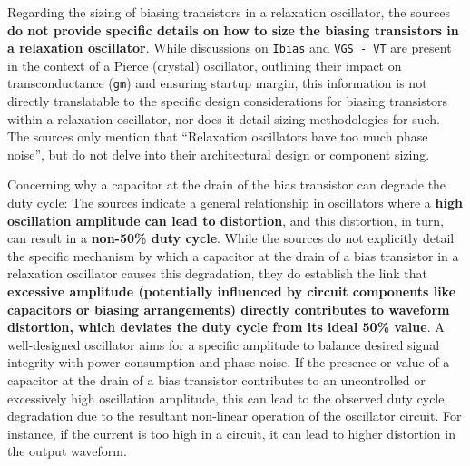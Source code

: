\documentclass[
  a4paper,
]{article}
\begin{document}
\begin{enumerate}
  Regarding the sizing of biasing transistors in a relaxation
  oscillator, the sources \textbf{do not provide specific details on how
  to size the biasing transistors in a relaxation oscillator}. While
  discussions on \texttt{Ibias} and \texttt{VGS\ -\ VT} are present in
  the context of a Pierce (crystal) oscillator, outlining their impact
  on transconductance (\texttt{gm}) and ensuring startup margin, this
  information is not directly translatable to the specific design
  considerations for biasing transistors within a relaxation oscillator,
  nor does it detail sizing methodologies for such. The sources only
  mention that ``Relaxation oscillators have too much phase noise'', but
  do not delve into their architectural design or component sizing.

  Concerning why a capacitor at the drain of the bias transistor can
  degrade the duty cycle: The sources indicate a general relationship in
  oscillators where a \textbf{high oscillation amplitude can lead to
  distortion}, and this distortion, in turn, can result in a
  \textbf{non-50\% duty cycle}. While the sources do not explicitly
  detail the specific mechanism by which a capacitor at the drain of a
  bias transistor in a relaxation oscillator causes this degradation,
  they do establish the link that \textbf{excessive amplitude
  (potentially influenced by circuit components like capacitors or
  biasing arrangements) directly contributes to waveform distortion,
  which deviates the duty cycle from its ideal 50\% value}. A
  well-designed oscillator aims for a specific amplitude to balance
  desired signal integrity with power consumption and phase noise. If
  the presence or value of a capacitor at the drain of a bias transistor
  contributes to an uncontrolled or excessively high oscillation
  amplitude, this can lead to the observed duty cycle degradation due to
  the resultant non-linear operation of the oscillator circuit. For
  instance, if the current is too high in a circuit, it can lead to
  higher distortion in the output waveform.
\end{enumerate}
\end{document}
